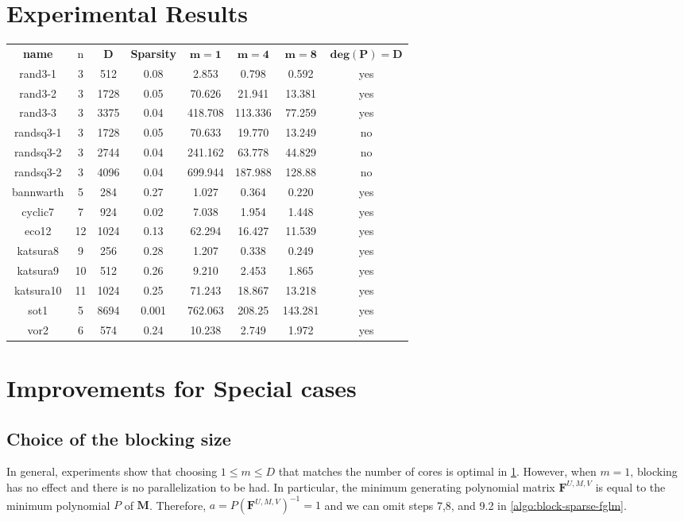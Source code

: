 \documentclass[12pt]{article}
\def\mF{\mathbf{F}}
\def\mM{\mathbf{M}}
\begin{document}
\section{Experimental Results}\label{section:ex}
\bgroup
\def\arraystretch{2}
\setlength\tabcolsep{10pt}
\begin{center}
\begin{tabular}{c|c|c|c|c|c|c|c}
	\textbf{name}& n& $\mathbf{D}$ & \textbf{Sparsity} & $\mathbf{m = 1}$ & $\mathbf{m = 4}$ & $\mathbf{m = 8}$ & $\mathbf{deg(P) = D}$\\
	\cline{1-8}
	rand3-1   &3 & 512 & 0.08     & 2.853   & 0.798   & 0.592   & yes \\
	rand3-2   &3 & 1728& 0.05     & 70.626  & 21.941  & 13.381  & yes \\
	rand3-3   &3 & 3375& 0.04     & 418.708 & 113.336 & 77.259  & yes \\
	randsq3-1 &3 &  1728& 0.05     & 70.633  & 19.770  & 13.249  & no  \\
	randsq3-2 &3 & 2744& 0.04     & 241.162 & 63.778  & 44.829  & no  \\
	randsq3-2 &3 & 4096& 0.04     & 699.944 & 187.988 & 128.88  & no  \\
	bannwarth &5 & 284 & 0.27     & 1.027   & 0.364   & 0.220   & yes \\
	cyclic7   &7 & 924 & 0.02     & 7.038   & 1.954   & 1.448   & yes \\
	eco12     &12& 1024& 0.13     & 62.294  & 16.427  & 11.539  & yes \\
	katsura8  &9 & 256 & 0.28     & 1.207   & 0.338   & 0.249   & yes \\
	katsura9  &10& 512 & 0.26     & 9.210   & 2.453   & 1.865   & yes \\
	katsura10 &11& 1024& 0.25     & 71.243  & 18.867  & 13.218  & yes \\
	sot1      &5 & 8694& 0.001    & 762.063 & 208.25  & 143.281 & yes \\
	vor2      &6& 574 & 0.24     & 10.238  & 2.749   & 1.972   & yes 
\end{tabular}
\end{center}

\newpage
\section{Improvements for Special cases}
\subsection{Choice of the blocking size}
In general, experiments show that choosing $1 \le m \le D$ that matches
the number of cores is optimal in \cref{section:ex}. However,
when $m=1$, blocking has no effect and there is no parallelization
to be had. In particular, the minimum generating polynomial matrix
$\mF^{U,M,V}$ is equal to the minimum polynomial $P$ of $\mM$. Therefore,
$a = P (\mF^{U,M,V})^{-1} = 1$ and we can omit steps 7,8, and 9.2 in
\cref{algo:block-sparse-fglm}.
\end{document}

